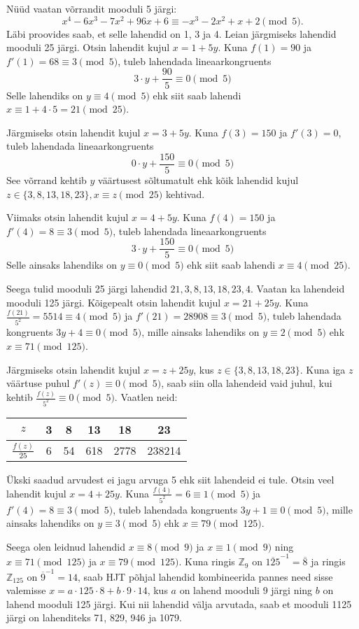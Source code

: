 \documentclass[a4paper, 10pt]{article}
\newcommand{\Z}{\mathbb{Z}}
\newcommand{\w}{\overline}
\begin{document}
Nüüd vaatan võrrandit mooduli 5 järgi:$$x^4-6x^3-7x^2+96x+6\equiv -x^3-2x^2+x+2  \pmod{5}.$$ Läbi proovides saab, et selle lahendid on 1, 3 ja 4. Leian järgmiseks lahendid mooduli 25 järgi. Otsin lahendit kujul $x=1+5y$. Kuna $f(1)=90$ ja $f'(1)=68\equiv3\pmod5$, tuleb lahendada lineaarkongruents $$3\cdot y+\frac{90}{5}\equiv0\pmod5$$ Selle lahendiks on $y\equiv4\pmod5$ ehk siit saab lahendi $x\equiv1+4\cdot5=21\pmod{25}$.

Järgmiseks otsin lahendit kujul $x=3+5y$. Kuna $f(3)=150$ ja $f'(3)=0$, tuleb lahendada lineaarkongruents $$0\cdot y+\frac{150}{5}\equiv0\pmod5$$ See võrrand kehtib $y$ väärtusest sõltumatult ehk kõik lahendid kujul $z\in\{3,8,13,18,23\}, x\equiv z\pmod{25}$ kehtivad.

Viimaks otsin lahendit kujul $x=4+5y$. Kuna $f(4)=150$ ja $f'(4)=8\equiv3\pmod5$, tuleb lahendada lineaarkongruents $$3\cdot y+\frac{150}{5}\equiv0\pmod5$$ Selle ainsaks lahendiks on $y\equiv0\pmod5$ ehk siit saab lahendi $x\equiv4\pmod{25}$.

Seega tulid mooduli 25 järgi lahendid $21,3,8,13,18,23,4$. Vaatan ka lahendeid mooduli 125 järgi. Kõigepealt otsin lahendit kujul $x=21+25y$. Kuna $\frac{f(21)}{5^2}=5514\equiv4\pmod5$ ja $f'(21)=28908\equiv3\pmod5$, tuleb lahendada kongruents $3y+4\equiv0\pmod5$, mille ainsaks lahendiks on $y\equiv2\pmod5$ ehk $x\equiv71\pmod{125}$.

Järgmiseks otsin lahendit kujul $x=z+25y$, kus $z\in\{3,8,13,18,23\}$. Kuna iga $z$ väärtuse puhul $f'(z)\equiv 0\pmod5$, saab siin olla lahendeid vaid juhul, kui kehtib $\frac{f(z)}{5^2}\equiv0\pmod5$. Vaatlen neid:

\begin{tabular}{c|c|c|c|c|c}
$z$&3&8&13&18&23\\
\hline
$\frac{f(z)}{25}$&6&54&618&2778&238214\\
\end{tabular}

Ükski saadud arvudest ei jagu arvuga 5 ehk siit lahendeid ei tule. Otsin veel lahendit kujul $x=4+25y$. Kuna $\frac{f(4)}{5^2}=6\equiv1\pmod5$ ja $f'(4)=8\equiv3\pmod5$, tuleb lahendada kongruents $3y+1\equiv0\pmod5$, mille ainsaks lahendiks on $y\equiv3\pmod5$ ehk $x\equiv79\pmod{125}$.

Seega olen leidnud lahendid $x\equiv8\pmod9$ ja $x\equiv1\pmod9$ ning $x\equiv71\pmod{125}$ ja $x\equiv79\pmod{125}$. Kuna ringis $\Z_9$ on $\w{125}^{-1}=\w8$ ja ringis $\Z_{125}$ on $\w9^{-1}=14$, saab HJT põhjal lahendid kombineerida pannes need sisse valemisse $x=a\cdot125\cdot8+b\cdot9\cdot14$, kus $a$ on lahend mooduli 9 järgi ning $b$ on lahend mooduli 125 järgi. Kui nii lahendid välja arvutada, saab et mooduli 1125 järgi on lahenditeks 71, 829, 946 ja 1079.
\bigskip
\end{document}
